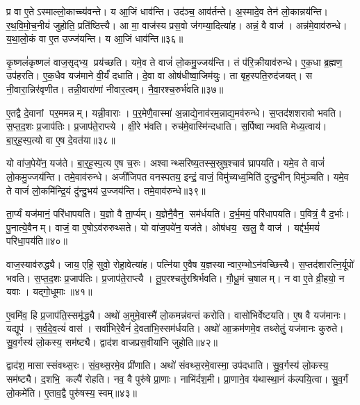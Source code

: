 प्र वा ए॒तेऽस्माल्लो॒काच्च्य॑वन्ते। य आ॒जिं धाव॑न्ति। उद॑ञ्च॒ आव॑र्तन्ते। अ॒स्मादे॒व तेन॑ लो॒कान्नय॑न्ति। र॒थ॒वि॒मो॒च॒नीयं॑ जुहोति॒ प्रति॑ष्ठित्त्यै। आ मा॒ वाज॑स्य प्रस॒वो ज॑गम्या॒दित्या॑ह। अन्नं॒ वै वाज॑। अन्न॑मे॒वाव॑रुन्धे। य॒था॒लो॒कं वा ए॒त उज्ज॑यन्ति। य आ॒जिं धाव॑न्ति॥३६॥

कृ॒ष्णलं॑कृष्णलं वाज॒सृद्भ्य॒ प्रय॑च्छति। यमे॒व ते वाजं॑ लो॒कमु॒ज्जय॑न्ति। तं प॑रि॒क्रीयाव॑रुन्धे। ए॒क॒धा ब्र॒ह्मण॒ उप॑हरति। ए॒क॒धैव यज॑माने वी॒र्यं॑ दधाति। दे॒वा वा ओष॑धीष्वा॒जिम॑युः। ता बृह॒स्पति॒रुद॑जयत्। स नी॒वारा॒न्निर॑वृणीत। तन्नी॒वारा॑णां नीवार॒त्वम्। नै॒वा॒रश्च॒रुर्भ॑वति॥३७॥

ए॒तद्वै दे॒वानां पर॒ममन्नम्। यन्नी॒वाराः। प॒र॒मेणै॒वास्मा॑ अ॒न्नाद्ये॒नाव॑रम॒न्नाद्य॒मव॑रुन्धे। स॒प्तद॑शशरावो भवति। स॒प्त॒द॒शः प्र॒जाप॑तिः। प्र॒जाप॑ते॒राप्त्ये। क्षी॒रे भ॑वति। रुच॑मे॒वास्मि॑न्दधाति। स॒र्पिष्वान्भवति मेध्य॒त्वाय॑। बा॒र्॒ह॒स्प॒त्यो वा ए॒ष दे॒वत॑या॥३८॥

यो वा॑ज॒पेये॑न॒ यज॑ते। बा॒र्॒ह॒स्प॒त्य ए॒ष च॒रुः। अश्वान्थ्सरिष्य॒तस्स॒स्रुष॒श्चाव॑ घ्रापयति। यमे॒व ते वाजं॑ लो॒कमु॒ज्जय॑न्ति। तमे॒वाव॑रुन्धे। अजी॑जिपत वनस्पतय॒ इन्द्रं॒ वाजं॒ विमु॑च्यध्व॒मिति॑ दुन्दु॒भीन् विमु॑ञ्चति। यमे॒व ते वाजं॑ लो॒कमि॑न्द्रि॒यं दु॑न्दु॒भय॑ उ॒ज्जय॑न्ति। तमे॒वाव॑रुन्धे॥३९॥

ता॒र्प्यं यज॑मानं॒ परि॑धापयति। य॒ज्ञो वै ता॒र्प्यम्। य॒ज्ञेनै॒वैन॒ सम॑र्धयति। द॒र्भ॒मयं॒ परि॑धापयति। प॒वित्रं॒ वै द॒र्भाः। पु॒नात्ये॒वैनम्। वाजं॒ वा ए॒षोऽव॑रुरुथ्सते। यो वा॑ज॒पये॑न॒ यज॑ते। ओष॑धय॒ खलु॒ वै वाज॑। यद्द॑र्भ॒मयं॑ परिधा॒पय॑ति॥४०॥

वाज॒स्याव॑रुद्ध्यै। जाय॒ एहि॒ सुवो॒ रोहा॒वेत्या॑ह। पत्नि॑या ए॒वैष य॒ज्ञस्यान्वार॒म्भोऽन॑वच्छित्त्यै। स॒प्तद॑शारत्नि॒र्यूपो॑ भवति। स॒प्त॒द॒शः प्र॒जाप॑तिः। प्र॒जाप॑ते॒राप्त्यै। तू॒प॒रश्चतु॑रश्रिर्भवति। गौ॒धू॒मं च॒षालम्। न वा ए॒ते व्री॒हयो॒ न यवाः। यद्गो॒धूमाः॥४१॥

ए॒वमि॑व॒ हि प्र॒जाप॑ति॒स्समृ॑द्ध्यै। अथो॑ अ॒मुमे॒वास्मै॑ लो॒कमन्न॑वन्तं करोति। वासो॑भिर्वेष्टयति। ए॒ष वै यज॑मानः। यद्यूप॑। स॒र्व॒दे॒व॒त्यं॑ वास॑। सर्वा॑भिरे॒वैनं॑ दे॒वता॑भि॒स्सम॑र्धयति। अथो॑ आ॒क्रम॑णमे॒व तथ्सेतुं॒ यज॑मानः कुरुते। सु॒व॒र्गस्य॑ लो॒कस्य॒ सम॑ष्ट्यै। द्वाद॑श वाजप्रस॒वीया॑नि जुहोति॥४२॥

द्वाद॑श॒ मासास्संवथ्स॒रः। सं॒व॒थ्स॒रमे॒व प्री॑णाति। अथो॑ संवथ्स॒रमे॒वास्मा॒ उप॑दधाति। सु॒व॒र्गस्य॑ लो॒कस्य॒ सम॑ष्ट्यै। द॒शभि॒ कल्पै॑ रोहति। नव॒ वै पुरु॑षे प्रा॒णाः। नाभि॑र्दश॒मी। प्रा॒णाने॒व य॑थास्था॒नं क॑ल्पयि॒त्वा। सु॒व॒र्गं लो॒कमे॑ति। ए॒ताव॒द्वै पुरु॑षस्य॒ स्वम्॥४३॥

